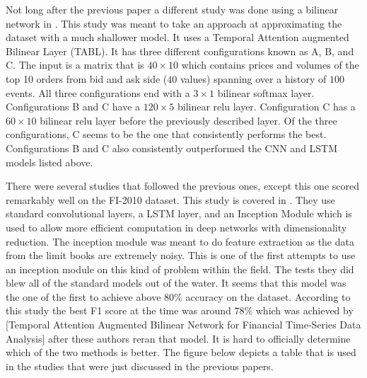 \documentclass{article}
\theoremstyle{plain}
\theoremstyle{definition}
\numberwithin{equation}{section}
\numberwithin{theorem}{section}
\numberwithin{lemma}{section}
\numberwithin{definition}{section}
\numberwithin{proposition}{section}
\numberwithin{corollary}{section}
\begin{document}
	
	Not long after the previous paper a different study was done using a bilinear network in \cite{Tran2017}. This study was meant to take an approach at approximating the dataset with a much shallower model. It uses a Temporal Attention augmented Bilinear Layer (TABL). It has three different configurations known as A, B, and C. The input is a matrix that is $40 \times 10$ which contains prices and volumes of the top 10 orders from bid and ask side ($40$ values) spanning over a history of $100$ events. All three configurations end with a $3 \times 1$ bilinear softmax layer. Configurations B and C have a $120 \times 5$ bilinear relu layer. Configuration C has a $60 \times 10$ bilinear relu layer before the previously described layer. Of the three configurations, C seems to be the one that consistently performs the best. Configurations B and C also consistently outperformed the CNN and LSTM models listed above.
	
	
	There were several studies that followed the previous ones, except this one scored remarkably well on the FI-2010 dataset. This study is covered in \cite{deepLOB}. They use standard convolutional layers, a LSTM layer, and an Inception Module which is used to allow more efficient computation in deep networks with dimensionality reduction. The inception module was meant to do feature extraction as the data from the limit books are extremely noisy. This is one of the first attempts to use an inception module on this kind of problem within the field. The tests they did blew all of the standard models out of the water. It seems that this model was the one of the first to achieve above $80\%$ accuracy on the dataset. According to this study the best F1 score at the time was around $78\%$ which was achieved by [Temporal Attention Augmented Bilinear Network for Financial Time-Series Data Analysis] after these authors reran that model. It is hard to officially determine which of the two methods is better. The figure below depicts a table that is used in the studies that were just discussed in the previous papers. 
	
\end{document}

